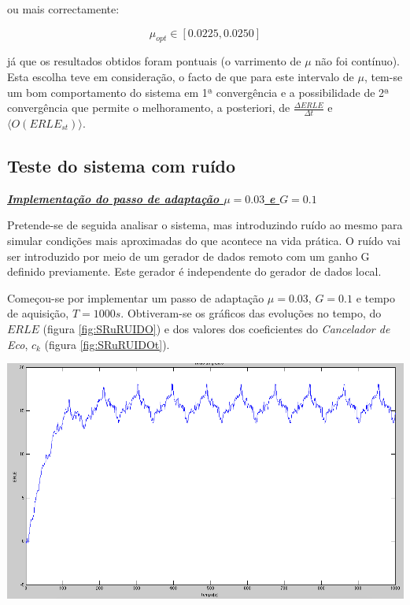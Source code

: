 \documentclass[a4paper,11pt]{report}
\begin{document}
ou mais correctamente: 

$$\mu_{opt}\in[0.0225,0.0250]$$

 já que os resultados obtidos foram pontuais (o varrimento de $\mu$ não foi contínuo). Esta escolha teve em consideração, o facto de que para este intervalo de $\mu$, tem-se um bom comportamento do sistema em 1ª convergência e a possibilidade de 2ª convergência que permite o melhoramento, a posteriori, de $\frac{\Delta ERLE}{\Delta t}$ e  $\langle O(ERLE_{st})\rangle$.







\subsection{Teste do sistema com ruído}

\large\underline{{\textit{\textbf{Implementação do passo de adaptação $\mu=0.03$ e $G=0.1$}}}}\\
\par
Pretende-se de seguida analisar o sistema, mas introduzindo ruído ao mesmo para simular condições mais aproximadas do que acontece na vida prática. O ruído vai ser introduzido por meio de um gerador de dados remoto com um ganho G definido previamente. Este gerador é independente do gerador de dados local.

Começou-se por implementar um passo de adaptação $\mu=0.03$, $G=0.1$ e tempo de aquisição, $T=1000s$. Obtiveram-se os gráficos  das evoluções no tempo, do $ERLE$ (figura \ref{fig:SRuRUIDO}) e dos valores dos coeficientes do \textit{Cancelador de Eco}, $c_k$ (figura \ref{fig:SRuRUIDOt}).


\begin{center}
     \includegraphics[angle=0,width=1\textwidth]{ERLE_G0_1}
     \label{fig:SRuRUIDO}
     \end{center}
\end{document}
